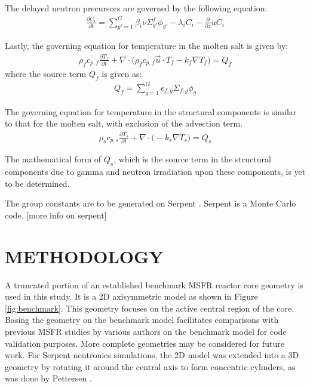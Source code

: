\documentclass{anstrans}
\begin{document}
The delayed neutron precursors are governed by the following equation:
\begin{align}
\frac{\partial C_i}{\partial t} = \sum^G_{g'=1} \beta_i \nu \Sigma^f_{g'} \phi_{g'} - \lambda_i C_i - \frac{\partial}{\partial z} u C_i \label{eq2}
\end{align}

Lastly, the governing equation for temperature in the molten salt is given by:
\begin{align}
\rho_f c_{p,f} \frac{\partial T_f}{\partial t} + \nabla \cdot \big( \rho_f c_{p,f} \overrightarrow{u} \cdot T_f - k_f \nabla T_f \big) = Q_f \label{eq3}
\end{align}
where the source term $Q_f$ is given as:
\begin{align}
Q_f = \sum^G_{g=1} \epsilon_{f,g} \Sigma_{f,g} \phi_g \label{eq4}
\end{align}

The governing equation for temperature in the structural components is similar to that for the molten salt, with exclusion of the advection term.
\begin{align}
\rho_s c_{p,s} \frac{\partial T_s}{\partial t} + \nabla \cdot \big(- k_s \nabla T_s \big) = Q_s \label{eq5}
\end{align}

The mathematical form of $Q_s$, which is the source term in the structural components due to gamma and neutron irradiation upon these components, is yet to be determined.

The group constants are to be generated on Serpent \cite{leppanen_serpent_2015}. Serpent is a Monte Carlo code. [more info on serpent]

\section{METHODOLOGY}

A truncated portion of an established benchmark MSFR reactor core geometry \cite{pettersen_coupled_2016} is used in this study. It is a 2D axisymmetric model as shown in Figure \ref{fig:benchmark}. This geometry focuses on the active central region of the core. Basing the geometry on the benchmark model facilitates comparisons with previous MSFR studies by various authors \cite{fiorina_modelling_2014} \cite{pettersen_coupled_2016} on the benchmark model for code validation purposes. More complete geometries may be considered for future work. For Serpent neutronics simulations, the 2D model was extended into a 3D geometry by rotating it around the central axis to form concentric cylinders, as was done by Pettersen \cite{pettersen_coupled_2016}.
\end{document}
